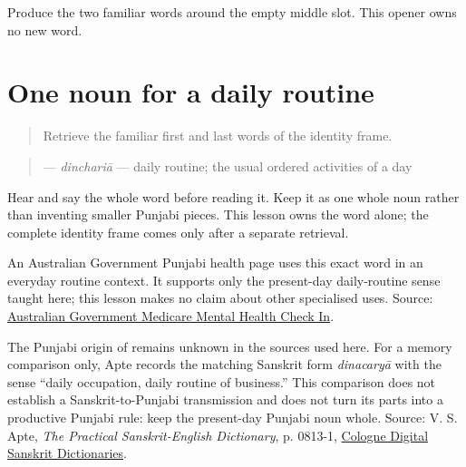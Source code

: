 \begin{tcolorbox}[breakable,colback=teal!4,colframe=teal!35!black,title={Before you move on}]
Produce the two familiar words around the empty middle slot. This opener owns no new word.
\end{tcolorbox}
\section[\texorpdfstring{\pa{ਦਿਨਚਰਿਆ} (dinchariyaa)}{ਦਿਨਚਰਿਆ (dinchariyaa)}]{One noun for a daily routine}

\label{lesson:PA-C197-dinchariya}



\begin{quote}
Retrieve the familiar first and last words of the identity frame.
\end{quote}

\begin{grammarlens}[title={Grammar Lens: direct owner}]
\begin{quote}
\textbf{} — \emph{dinchariā} — daily routine; the usual ordered activities of a day
\end{quote}

Hear and say the whole word before reading it. Keep it as one whole noun rather than inventing smaller Punjabi pieces. This lesson owns the word alone; the complete identity frame comes only after a separate retrieval.
\end{grammarlens}

\begin{cousinweb}
An Australian Government Punjabi health page uses this exact word in an everyday routine context. It supports only the present-day daily-routine sense taught here; this lesson makes no claim about other specialised uses. Source: \href{https://www.medicarementalhealthcheckin.gov.au/pa}{Australian Government Medicare Mental Health Check In}.

The Punjabi origin of \textbf{} remains unknown in the sources used here. For a memory comparison only, Apte records the matching Sanskrit form \emph{dinacaryā} with the sense “daily occupation, daily routine of business.” This comparison does not establish a Sanskrit-to-Punjabi transmission and does not turn its parts into a productive Punjabi rule: keep the present-day Punjabi noun whole. Source: V. S. Apte, \emph{The Practical Sanskrit-English Dictionary}, p. 0813-1, \href{https://www.sanskrit-lexicon.uni-koeln.de/scans/APScan/2020/web/webtc/getword.php?key=dinacaryA\&filter=roman\&accent=no\&transLit=slp1}{Cologne Digital Sanskrit Dictionaries}.
\end{cousinweb}

